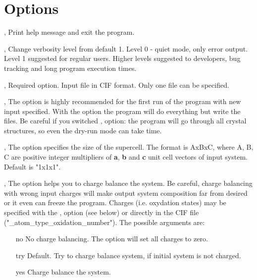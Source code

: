\documentclass[a4paper,english]{article}
\begin{document}
\section{Options}
\begin{Description}

\item[\Opt{-h}, \Opt{\Dd help}]
      Print help message and exit the program.

\item[\OptArg{-v }{level}, \OptArg{\Dd verbose=}{level}] 
      Change verbosity level from default 1. Level 0 - quiet mode, only error output. Level 1 suggested for regular users. Higher levels suggested to developers, bug tracking and long program execution times. 

\item[\OptArg{-i }{input-file}, \OptArg{\Dd input=}{input-file}]
      Required option. Input file in CIF format. Only one file can be specified.

\item[\Opt{-d}, \Opt{\Dd dry-run}]
      The option is highly recommended for the first run of the program with new input specified. 
      With the option the program will do everything but write the files. Be careful if you switched ,  option: the program will go through all crystal structures, so even the dry-run mode can take time.

\item[\OptArg{-s }{cell-size}, \OptArg{\Dd cell-size=}{cell-size}]
      The option specifies the size of the supercell. The format is AxBxC, where A, B, C are positive integer multipliers of \textbf{a}, \textbf{b} and \textbf{c} unit cell vectors of input system. Default is "1x1x1".

\item[\OptArg{-c }{balance-type}, \OptArg{\Dd charge-balance=}{balance-type}]
      The option helps you to charge balance the system. Be careful, charge balancing with wrong input charges will make output system composition far from desired or it even can freeze the program.  Charges (i.e. oxydation states) may be specified with the ,  option (see below) or directly in the CIF file ("\_atom\_type\_oxidation\_number"). The possible arguments are:
      \begin{itemize}
         \item[no]   No charge balancing. The option will set all charges to zero.
         \item[try]  Default. Try to charge balance system, if initial system is not charged.
         \item[yes]  Charge balance the system.
      \end{itemize}


\end{Description}
\end{document}
